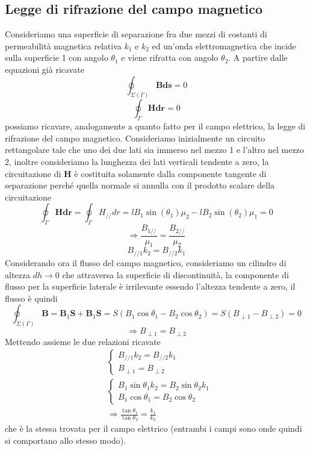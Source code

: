 \documentclass[
10pt, %
a4paper, %
oneside, %
headinclude,footinclude, %
BCOR5mm, %
]{scrartcl}
\begin{document}
\subsection{Legge di rifrazione del campo magnetico}
Consideriamo una superficie di separazione fra due mezzi di costanti di permeabilità magnetica relativa \(k_1\) e \(k_2\) ed un'onda elettromagnetica che incide sulla superficie 1 con angolo $\theta_1$ e viene rifratta con angolo $\theta_2$. A partire dalle equazioni già ricavate
\[\oint_{\Sigma(\Gamma)} \mathbf{B} \mathbf{ds} = 0\]
\[\oint_\Gamma \mathbf{H} \mathbf{dr} = 0\]
possiamo ricavare, analogamente a quanto fatto per il campo elettrico, la legge di rifrazione del campo magnetico. Consideriamo inizialmente un circuito rettangolare tale che uno dei due lati sia immerso nel mezzo 1 e l'altro nel mezzo 2, inoltre consideriamo la lunghezza dei lati verticali tendente a zero, la circuitazione di \(\mathbf{H}\) è costituita solamente dalla componente tangente di separazione perché quella normale si annulla con il prodotto scalare della circuitazione
\[\oint_\Gamma \mathbf{H} \mathbf{dr} = \oint_\Gamma H_{//} dr = l B_1\sin(\theta_1)\mu_2 -  l B_2\sin(\theta_2)\mu_1 = 0\]
\[\Rightarrow \frac{B_{1//}}{\mu_1} = \frac{B_{2//}}{\mu_2}\]
\[B_{//1}k_2 =  B_{//2}k_1\]
Considerando ora il flusso del campo magnetico, consideriamo un cilindro di altezza \(dh\to 0\) che attraversa la superficie di discontinuità, la componente di flusso per la superficie laterale è irrilevante essendo l'altezza tendente a zero, il flusso è quindi
\[\oint_{\Sigma(\Gamma)}\mathbf{B} = \mathbf{B}_1\mathbf{S} +  \mathbf{B}_1\mathbf{S} = S(B_1\cos\theta_1 -B_2\cos\theta_2)=S(B_{\perp 1}- B_{\perp 2})=0 \]
\[\Rightarrow B_{\perp 1} = B_{\perp 2}\]
Mettendo assieme le due relazioni ricavate
\begin{align*}
	&\begin{cases}
		B_{//1}k_2 =  B_{//2}k_1\\
		B_{\perp 1} = B_{\perp 2}
	\end{cases}\\
	&\begin{cases}
		B_{1}\sin\theta_1 k_2 =  B_{2}\sin\theta_2 k_1\\
		B_{1}\cos\theta_1 = B_{2}\cos\theta_2
	\end{cases}\\
&\Rightarrow \frac{\tan\theta_1}{\tan\theta_2} =\frac{k_1}{k_2}
\end{align*}
che è la stessa trovata per il campo elettrico (entrambi i campi sono onde quindi si comportano allo stesso modo).
\newpage
\end{document}
